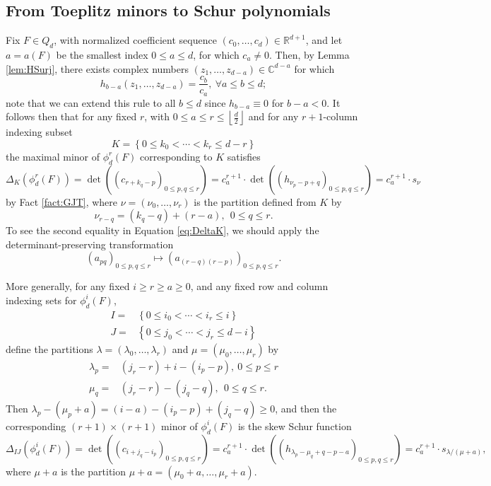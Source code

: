\documentclass[unnumsec,webpdf,modern,medium]{oup-authoring-template}
\newcommand{\C}{\mathbb{C}}
\newcommand{\R}{\mathbb{R}}
\newcommand{\flo}[1]{\left\lfloor\frac{#1}{2}\right\rfloor}
\theoremstyle{theorem}
\theoremstyle{definition}
\begin{document}
\subsection{From Toeplitz minors to Schur polynomials}
Fix $F\in Q_d$, with normalized coefficient sequence $(c_0,\ldots,c_d)\in\R^{d+1}$, and let $a=a(F)$ be the smallest index $0\leq a\leq d$, for which $c_a\neq 0$.  Then, by Lemma \ref{lem:HSurj}, there exists complex numbers $(z_1,\ldots,z_{d-a})\in\C^{d-a}$ for which 
$$h_{b-a}(z_1,\ldots,z_{d-a})=\frac{c_b}{c_a}, \ \forall a\leq b\leq d;$$
note that we can extend this rule to all $b\leq d$ since $h_{b-a}\equiv 0$ for $b-a<0$.  It follows then that for any fixed $r$, with $0\leq a\leq  r\leq \flo{d}$ and for any $r+1$-column indexing subset 
$$K=\left\{0\leq k_0<\cdots<k_r\leq d-r\right\}$$
the maximal minor of $\phi^r_d(F)$ corresponding to $K$ satisfies
\begin{equation}
	\label{eq:DeltaK}
	\Delta_K(\phi^r_d(F))=\det\left(\left(c_{r+k_q-p}\right)_{0\leq p,q\leq r}\right)=c_a^{r+1}\cdot \det\left(\left(h_{\nu_{p}-p+q}\right)_{0\leq p,q\leq r}\right)=c_a^{r+1}\cdot s_{\nu}
\end{equation}
by Fact \ref{fact:GJT}, where $\nu=(\nu_0,\ldots,\nu_r)$ is the partition defined from $K$ by 
\begin{equation}
	\label{eq:nu}
	\nu_{r-q}=(k_q-q)+(r-a), \ \ 0\leq q\leq r.
\end{equation}
To see the second equality in Equation \eqref{eq:DeltaK}, we should apply the determinant-preserving transformation
$$\left(a_{pq}\right)_{0\leq p,q\leq r}\mapsto \left(a_{(r-q)(r-p)}\right)_{0\leq p,q\leq r}.$$

More generally, for any fixed $i\geq r\geq a\geq 0$, and any fixed row and column indexing sets for $\phi^i_d(F)$,
\begin{align*}
	I = & \left\{0\leq i_0<\cdots<i_r\leq i\right\}\\
	J = & \left\{0\leq j_0<\cdots<j_r\leq d-i\right\}
\end{align*}
define the partitions $\lambda=(\lambda_0,\ldots,\lambda_r)$ and $\mu=(\mu_0,\ldots,\mu_r)$ by 
\begin{align}
	\label{eq:lambda0}
	\lambda_p= & (j_r-r)+i-(i_p-p), \ 0\leq p\leq r\\
	\label{eq:mu0}
	\mu_q = & (j_r-r)-(j_q-q), \ \ 0\leq q\leq r.
\end{align}
Then $\lambda_p-(\mu_p+a)=(i-a)-(i_p-p)+(j_q-q)\geq 0$, and then the corresponding $(r+1)\times (r+1)$ minor of $\phi^i_d(F)$ is the skew Schur function
$$\Delta_{IJ}\left(\phi^i_d(F)\right)=\det\left(\left(c_{i+j_q-i_p}\right)_{0\leq p,q\leq r}\right)=c_a^{r+1}\cdot\det\left(\left(h_{\lambda_p-\mu_q+q-p-a}\right)_{0\leq p,q\leq r}\right)=c_a^{r+1}\cdot s_{\lambda/(\mu+a)},$$
where $\mu+a$ is the partition $\mu+a=(\mu_0+a,\ldots,\mu_r+a)$.
\end{document}

